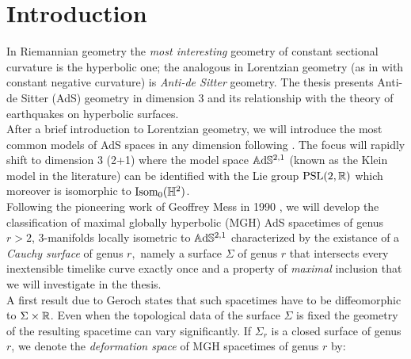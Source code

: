 \chapter*{Introduction}


In Riemannian geometry the \textit{most interesting} geometry of constant sectional curvature is the hyperbolic one; the analogous in Lorentzian geometry  (as in with constant negative curvature) is \textit{Anti-de Sitter} geometry. The thesis presents Anti-de Sitter (AdS) geometry in dimension 3 and its relationship with the theory of earthquakes on hyperbolic surfaces.\\ After a brief introduction to Lorentzian geometry, we will introduce the most common models of AdS spaces in any dimension following \cite{bonsanteseppi}. The focus will rapidly shift to dimension 3 (2+1) where the model space $\mathbb{A}\mathrm{d}\mathbb{S}^{2,1}$ (known as the Klein model in the literature) can be identified with the Lie group $\text{PSL}(2,\mathbb{R})$ which moreover is isomorphic to $\text{Isom}_0(\mathbb{H}^2)$.\\ Following the pioneering work of Geoffrey Mess in 1990 \cite{Mess}, we will develop the classification of maximal globally hyperbolic (MGH) AdS spacetimes of genus $r>2$, 3-manifolds locally isometric to $\mathbb{A}\mathrm{d}\mathbb{S}^{2,1}$ characterized by the existance of a \textit{Cauchy surface} of genus $r,$ namely a surface $\Sigma$ of genus $r$ that intersects every inextensible timelike curve exactly once and a property of \textit{maximal} inclusion that we will investigate in the thesis.\\ A first result due to Geroch \cite{hawking2023large} states that such spacetimes have to be diffeomorphic to $\Sigma\times\mathbb{R}$. Even when the topological data of the surface $\Sigma$ is fixed the geometry of the resulting spacetime can vary significantly. If $\Sigma_r$ is a closed surface of genus $r$, we denote the \textit{deformation space} of MGH spacetimes of genus $r$ by:

